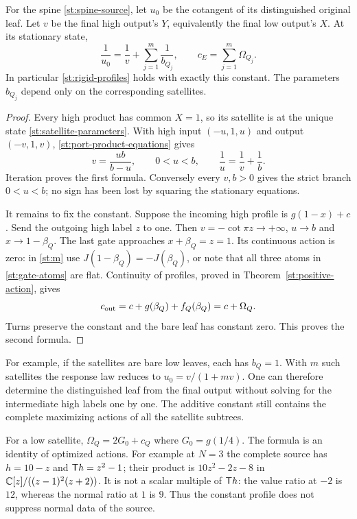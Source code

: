 \begin{theorem}\label{st:profiles}
For the spine \eqref{st:spine-source}, let $u_0$
be the cotangent of its distinguished original leaf.
Let $v$ be the final high output's $Y$, equivalently
the final low output's $X$. At its stationary state,
\begin{equation}\label{st:harmonic}
 \frac1{u_0}=\frac1v+\sum_{j=1}^m\frac1{b_{Q_j}},
 \qquad
 c_E=\sum_{j=1}^m\Omega_{Q_j}.
\end{equation}
In particular \eqref{st:rigid-profiles} holds with
exactly this constant. The parameters $b_{Q_j}$
depend only on the corresponding satellites.
\end{theorem}
\begin{proof}
Every high product has common $X=1$, so its satellite
is at the unique state \eqref{st:satellite-parameters}.
With high input $(-u,1,u)$ and output $(-v,1,v)$,
\eqref{st:port-product-equations} gives
\begin{equation}\label{st:one-response}
 v=\frac{ub}{b-u},\qquad
 0<u<b,\qquad \frac1u=\frac1v+\frac1b .
\end{equation}
Iteration proves the first formula. Conversely every
$v,b>0$ gives the strict branch $0<u<b$; no sign
has been lost by squaring the stationary equations.

It remains to fix the constant. Suppose the incoming
high profile is $g(1-x)+c$. Send the outgoing high
label $z$ to one. Then
$v=-\cot\pi z\to+\infty$, $u\to b$ and
$x\to1-\beta_Q$. The last gate approaches
$x+\beta_Q=z=1$. Its continuous action is zero:
in \eqref{st:m} use $J(1-\beta_Q)=-J(\beta_Q)$,
or note that all three atoms in
\eqref{st:gate-atoms} are flat.
Continuity of profiles, proved in
Theorem~\ref{st:positive-action}, gives
\[
 c_{\rm out}=c+g(\beta_Q)+f_Q(\beta_Q)=c+\Omega_Q.
\]
Turns preserve the constant and the bare leaf has
constant zero. This proves the second formula.
\end{proof}
For example, if the satellites are bare low leaves, each has $b_Q=1$.
With $m$ such satellites the response law reduces to
$u_0=v/(1+mv)$. One can therefore determine the distinguished leaf
from the final output without solving for the intermediate high
labels one by one. The additive constant still contains the complete
maximizing actions of all the satellite subtrees.

For a low satellite, $\Omega_Q=2G_0+c_Q$ where
$G_0=g(1/4)$. The formula is an identity of optimized
actions. For example at $N=3$ the complete source has
$h=10-z$ and $\mathsf T h=z^2-1$; their product is
$10z^2-2z-8$ in
$\mathbb C[z]/((z-1)^2(z+2))$. It is not a scalar
multiple of $\mathsf T h$: the value ratio at $-2$ is
$12$, whereas the normal ratio at $1$ is $9$.
Thus the constant profile does not suppress normal
data of the source.

